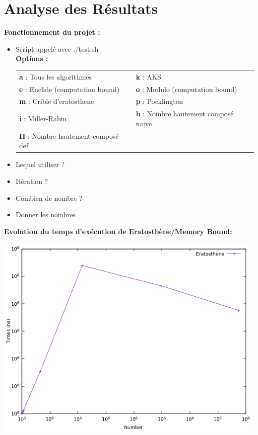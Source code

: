 	\section{Analyse des Résultats}
		\begin{frame}
		\textbf{Fonctionnement du projet :}

	\begin{itemize}
		\item Script appelé avec ./test.sh\\
\textbf{Options :}


	\begin{center}\footnotesize\begin{longtable}{l l}		
	\textbf{a} : Tous les algorithmes  & \textbf{k} : AKS\\
	\textbf{e} : Euclide (computation bound) & \textbf{o} : Modulo (computation bound)\\
	\textbf{m} : Crible d'eratosthene & \textbf{p} : Pocklington\\
	\textbf{i} : Miller-Rabin & \textbf{h} : Nombre hautement composé naive\\
	\textbf{H} : Nombre hautement composé def\\
	\end{longtable}\vspace{-2.2em}\end{center}

		\item Lequel utiliser ?\\
		\item Itération ?\\
		\item Combien de nombre ?\\
		\item Donner les nombres\\
	\end{itemize}
		\end{frame}
		\begin{frame}
		\textbf{Evolution du temps d'exécution de Eratosthène/Memory Bound: }
		\begin{center}\includegraphics[scale=0.5]{eratosthene.png}\end{center}
		\end{frame}
		
